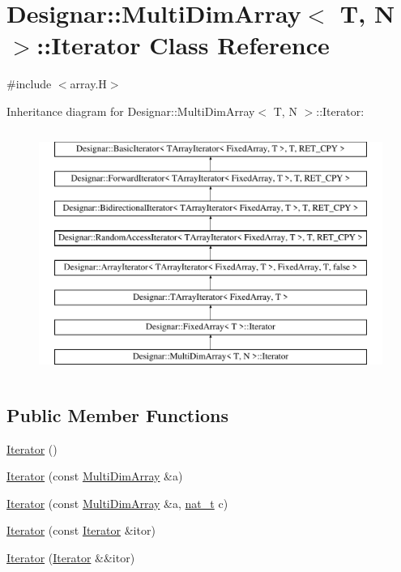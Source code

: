 \hypertarget{class_designar_1_1_multi_dim_array_1_1_iterator}{}\section{Designar\+:\+:Multi\+Dim\+Array$<$ T, N $>$\+:\+:Iterator Class Reference}
\label{class_designar_1_1_multi_dim_array_1_1_iterator}


{\ttfamily \#include $<$array.\+H$>$}

Inheritance diagram for Designar\+:\+:Multi\+Dim\+Array$<$ T, N $>$\+:\+:Iterator\+:\begin{figure}[H]
\begin{center}
\leavevmode
\includegraphics[height=8.000000cm]{class_designar_1_1_multi_dim_array_1_1_iterator}
\end{center}
\end{figure}
\subsection*{Public Member Functions}
\begin{DoxyCompactItemize}
\item 
\hyperlink{class_designar_1_1_multi_dim_array_1_1_iterator_af627beb86cf5b1154f421078082b18f9}{Iterator} ()
\item 
\hyperlink{class_designar_1_1_multi_dim_array_1_1_iterator_a0b4865a27a5f64866d63376f24076b9f}{Iterator} (const \hyperlink{class_designar_1_1_multi_dim_array}{Multi\+Dim\+Array} \&a)
\item 
\hyperlink{class_designar_1_1_multi_dim_array_1_1_iterator_a557464a713807cd34a23a3c9cd29dbb0}{Iterator} (const \hyperlink{class_designar_1_1_multi_dim_array}{Multi\+Dim\+Array} \&a, \hyperlink{namespace_designar_aa72662848b9f4815e7bf31a7cf3e33d1}{nat\+\_\+t} c)
\item 
\hyperlink{class_designar_1_1_multi_dim_array_1_1_iterator_a2d0c217ae08b2203c50e1d1a01c3af40}{Iterator} (const \hyperlink{class_designar_1_1_multi_dim_array_1_1_iterator}{Iterator} \&itor)
\item 
\hyperlink{class_designar_1_1_multi_dim_array_1_1_iterator_af6ebf97caae786b50dcb6062b3ab7b0b}{Iterator} (\hyperlink{class_designar_1_1_multi_dim_array_1_1_iterator}{Iterator} \&\&itor)
\end{DoxyCompactItemize}
